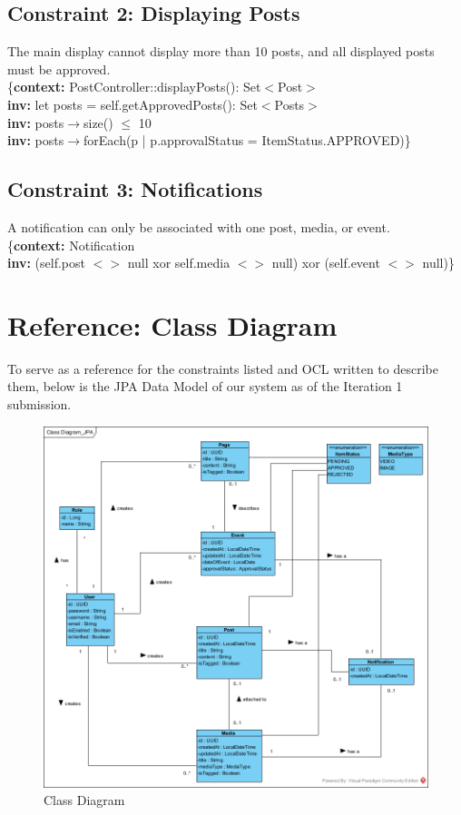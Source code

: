 \documentclass{article}
\begin{document}
\subsection{Constraint 2: Displaying Posts}

The main display cannot display more than 10 posts, and all displayed posts must be approved. \\

\{\textbf{context:} PostController::displayPosts(): Set$<$Post$>$ \\
\textbf{inv:} let posts = self.getApprovedPosts(): Set$<$Posts$>$ \\
\textbf{inv:} posts$\rightarrow$size() $\leq$ 10 \\
\textbf{inv:} posts$\rightarrow$forEach(p | p.approvalStatus = ItemStatus.APPROVED)\} \\

\subsection{Constraint 3: Notifications}

A notification can only be associated with one post, media, or event. \\

\{\textbf{context:} Notification \\
\textbf{inv:} (self.post $<$$>$ null xor self.media $<$$>$ null) xor (self.event $<$$>$ null)\}  \\

\section{Reference: Class Diagram}

To serve as a reference for the constraints listed and OCL written to describe them, below is the JPA Data Model of our system as of the Iteration 1 submission.

\begin{figure}[H]
    \centering
    \includegraphics[width=.98\textwidth]{images/ClassDiagram.png}
    \centering
    \caption{Class Diagram}
\end{figure}
\end{document}
